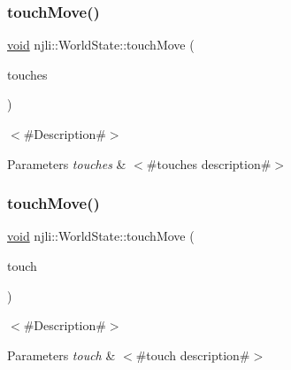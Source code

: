 \subsubsection{\texorpdfstring{touch\+Move()}{touchMove()}\hspace{0.1cm}{\footnotesize\ttfamily [1/2]}}
{\footnotesize\ttfamily \mbox{\hyperlink{_thread_8h_af1e856da2e658414cb2456cb6f7ebc66}{void}} njli\+::\+World\+State\+::touch\+Move (\begin{DoxyParamCaption}\item[{\mbox{\hyperlink{classnjli_1_1_device_touch}{Device\+Touch}} $\ast$$\ast$}]{touches }\end{DoxyParamCaption})}

$<$\#\+Description\#$>$


\begin{DoxyParams}{Parameters}
{\em touches} & $<$\#touches description\#$>$ \\
\hline
\end{DoxyParams}
\mbox{\label{classnjli_1_1_world_state_aed77904328c681d57276d53b1fecaaae}} 
\subsubsection{\texorpdfstring{touch\+Move()}{touchMove()}\hspace{0.1cm}{\footnotesize\ttfamily [2/2]}}
{\footnotesize\ttfamily \mbox{\hyperlink{_thread_8h_af1e856da2e658414cb2456cb6f7ebc66}{void}} njli\+::\+World\+State\+::touch\+Move (\begin{DoxyParamCaption}\item[{const \mbox{\hyperlink{classnjli_1_1_device_touch}{Device\+Touch}} \&}]{touch }\end{DoxyParamCaption})}

$<$\#\+Description\#$>$


\begin{DoxyParams}{Parameters}
{\em touch} & $<$\#touch description\#$>$ \\
\hline
\end{DoxyParams}
\mbox{\label{classnjli_1_1_world_state_a62fe7209ccfa24f32533ba66463532bd}} 
